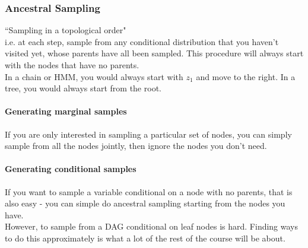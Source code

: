 \documentclass[11pt]{article}
\begin{document}
\subsubsection{Ancestral Sampling}
``Sampling in a topological order"\\
i.e. at each step, sample from any conditional distribution that you haven't visited yet, whose parents have all been sampled. This procedure will always start with the nodes that have no parents.\\
\example
In a chain or HMM, you would always start with $z_1$ and move to the right. In a tree, you would always start from the root.

\paragraph{Generating marginal samples}
If you are only interested in sampling a particular set of nodes, you can simply sample from all the nodes jointly, then ignore the nodes you don't need.

\paragraph{Generating conditional samples}
If you want to sample a variable conditional on a node with no parents, that is also easy - you can simple do ancestral sampling starting from the nodes you have.\\
However, to sample from a DAG conditional on leaf nodes is hard. Finding ways to do this approximately is what a lot of the rest of the course will be about.
\end{document}

